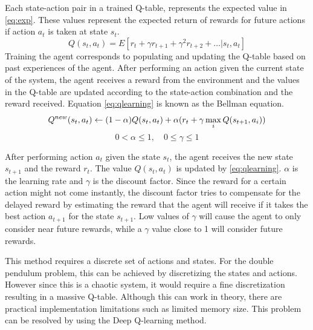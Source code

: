 \documentclass{LTHtwocol} %
\begin{document}
Each state-action pair in a trained Q-table, represents the expected value in \eqref{eq:exp}. These values represent the expected return of rewards for future actions if action $a_t$ is taken at state $s_t$.
\begin{equation}
Q(s_t,a_t) = E[r_t + \gamma r_{t+1} + \gamma^2 r_{t+2} + \hdots | s_t,a_t] 
\label{eq:exp}
\end{equation}
Training the agent corresponds to populating and updating the Q-table based on past experiences of the agent.
After performing an action given the current state of the system, the agent receives a reward from the environment and the values in the Q-table are updated according to the state-action combination and the reward received.
Equation \eqref{eq:qlearning} is known as the Bellman equation.
\begin{equation}
Q^{new}(s_t,a_t) \leftarrow (1 - \alpha)Q(s_t,a_t) + \alpha (r_t + \gamma \max_i Q(s_{t+1},a_i )) \\
\label{eq:qlearning} 
\end{equation}
\[ 0 < \alpha \leq 1, \quad 0 \leq \gamma \leq 1  \]

After performing action $a_t$ given the state $s_t$, the agent receives the new state $s_{t+1}$ and the reward $r_t$. The value $Q(s_t,a_t)$ is updated by \eqref{eq:qlearning}. $\alpha$ is the learning rate and $\gamma$ is the discount factor. Since the reward for a certain action might not come instantly, the discount factor tries to compensate for the delayed reward by estimating the reward that the agent will receive if it takes the best action $a_{t+1}$ for the state $s_{t+1}$. Low values of $\gamma$ will cause the agent to only consider near future rewards, while a $\gamma$ value close to 1 will consider future rewards.


This method requires a discrete set of actions and states. For the double pendulum problem, this can be achieved by discretizing the states and actions.
However since this is a chaotic system, it would require a fine discretization resulting in a massive Q-table. Although this can work in theory, there are practical implementation limitations such as limited memory size.
This problem can be resolved by using the Deep Q-learning method.
\end{document}
